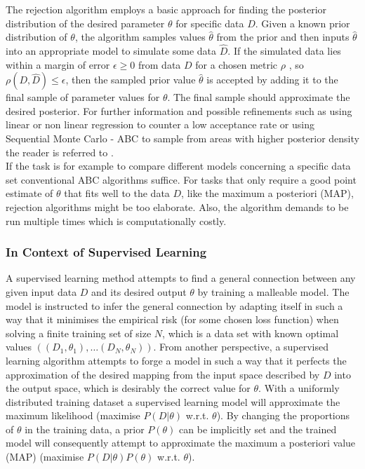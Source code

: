 \documentclass[a4paper, 11pt]{article}
\begin{document}
The rejection algorithm employs a basic approach for finding the posterior distribution of the desired parameter $\theta$ for specific data $D$. Given a known prior distribution of $\theta$, the algorithm samples values $\hat{\theta}$ from the prior and then inputs $\hat{\theta}$ into an appropriate model to simulate some data $\hat{D}$. If the simulated data lies within a margin of error $\epsilon \geq 0$ from data $D$ for a chosen metric $\rho$ , so $\rho(D, \hat{D}) \leq \epsilon$, then the sampled prior value $\hat{\theta}$ is accepted by adding it to the final sample of parameter values for $\theta$. The final sample should approximate the desired posterior. For further information and possible refinements such as using linear or non linear regression to counter a low acceptance rate or using Sequential Monte Carlo - ABC to sample from areas with higher posterior density the reader is referred to \cite{csillery2010approximate}. \\
If the task is for example to compare different models concerning a specific data set conventional ABC algorithms suffice. For tasks that only require a good point estimate of $\theta$ that fits well to the data $D$, like the maximum a posteriori (MAP), rejection algorithms might be too elaborate. Also, the algorithm demands to be run multiple times which is computationally costly.\\

\subsubsection{In Context of Supervised Learning}

A supervised learning method attempts to find a general connection between any given input data $D$ and its desired output $\theta$ by training a malleable model. The model is instructed to infer the general connection by adapting itself in such a way that it minimises the empirical risk (for some chosen loss function) when solving a finite training set of size $N$, which is a data set with known optimal values $((D_1,\theta_1),\ldots (D_N,\theta_N))$. From another perspective, a supervised learning algorithm attempts to forge a model in such a way that it perfects the approximation of the desired mapping from the input space described by $D$ into the output space, which is desirably the correct value for $\theta$. With a uniformly distributed training dataset a supervised learning model will approximate the maximum likelihood (maximise $P(D|\theta)$ w.r.t. $\theta$). By changing the proportions of $\theta$ in the training data, a prior $P(\theta)$ can be implicitly set and the trained model will consequently attempt to approximate the maximum a posteriori value (MAP) (maximise $P(D|\theta)P(\theta)$ w.r.t. $\theta$).\\
\end{document}
